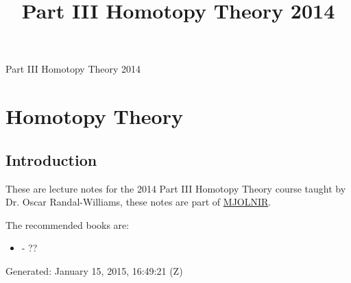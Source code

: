 \documentclass[10pt,]{book}
\title{Part III Homotopy Theory 2014}
\author{}
\date{}
\theoremstyle{plain}
\theoremstyle{definition}
\begin{document}
\frontmatter
\thispagestyle{empty}
\begin{center}
{\Huge Part III Homotopy Theory 2014}
\end{center}\par
{}
\clearpage
\thispagestyle{empty}
\clearpage
\maketitle
\clearpage
\thispagestyle{empty}
\clearpage
\setcounter{tocdepth}{1}
\renewcommand*\contentsname{Contents}
\tableofcontents
\mainmatter
\typeout{************************************************}
\typeout{************************************************}
\chapter[Homotopy Theory]{Homotopy Theory}\label{chap-homotopy}
\typeout{************************************************}
\typeout{************************************************}
\section[Introduction]{Introduction}\label{sec-introduction}
These are lecture notes for the 2014 Part III Homotopy Theory course taught by Dr. Oscar Randal-Williams, these notes are part of \href{https://alexjbest.github.io/mjolnir/}{MJOLNIR}.%
\par
The recommended books are: 
          \begin{itemize}
\item{} - ??\end{itemize}

\par

          Generated: January 15, 2015, 16:49:21 (Z)
\typeout{************************************************}
\typeout{************************************************}
\end{document}
